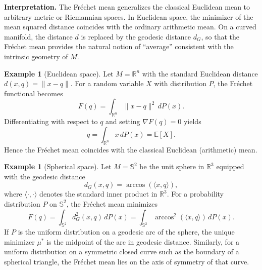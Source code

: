 \documentclass[12pt, reqno]{amsart}
\theoremstyle{plain}
\theoremstyle{definition}
\newtheorem{exam1}[subsubsection]{Example}
\newcommand{\D}[1]{\mathbb{#1}}%
\begin{document}
\vspace{1em}
\noindent\textbf{Interpretation.}
The Fr\'echet mean generalizes the classical Euclidean mean to arbitrary metric or Riemannian spaces.  
In Euclidean space, the minimizer of the mean squared distance coincides with the ordinary arithmetic mean.  
On a curved manifold, the distance $d$ is replaced by the geodesic distance $d_{G}$, so that the Fr\'echet mean provides the natural notion of ``average'' consistent with the intrinsic geometry of $M$.

\begin{exam1}[Euclidean space]
Let $M=\mathbb{R}^{n}$ with the standard Euclidean distance $d(x,q)=\|x-q\|$.  
For a random variable $X$ with distribution $P$, the Fr\'echet functional becomes
\[
F(q) = \int_{\mathbb{R}^{n}} \|x-q\|^{2}\,dP(x).
\]
Differentiating with respect to $q$ and setting $\nabla F(q)=0$ yields
\[
q = \int_{\mathbb{R}^{n}} x\,dP(x) = \mathbb{E}[X].
\]
Hence the Fr\'echet mean coincides with the classical Euclidean (arithmetic) mean.
\end{exam1}

\begin{exam1}[Spherical space]
Let $M=\D S^2$ be the unit sphere in $\mathbb{R}^{3}$ equipped with the geodesic distance
\[
d_{G}(x,q)=\arccos(\langle x,q\rangle),
\]
where $\langle \cdot,\cdot\rangle$ denotes the standard inner product in $\mathbb{R}^{3}$.  
For a probability distribution $P$ on $\D S^2$, the Fr\'echet mean minimizes
\[
F(q)=\int_{\D S^2} d_{G}^{2}(x,q)\,dP(x)
     =\int_{\D S^2} \arccos^{2}(\langle x,q\rangle)\,dP(x).
\]
If $P$ is the uniform distribution on a geodesic arc of the sphere, the unique minimizer $\mu^{*}$ is the midpoint of the arc in geodesic distance.  
Similarly, for a uniform distribution on a symmetric closed curve such as the boundary of a spherical triangle, the Fr\'echet mean lies on the axis of symmetry of that curve.
\end{exam1}

 
\end{document}
